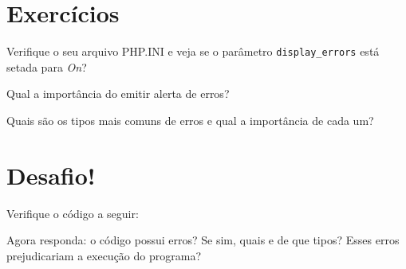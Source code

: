 


\section{Exercícios}
\label{cap11-exercicios}

\begin{description}[labelindent=30pt]
  \item [Q. 01] Verifique o seu arquivo PHP.INI e veja se o parâmetro \texttt{display\_errors} está 
  setada para \textit{On}?  
  \item [Q. 02] Qual a importância do \php emitir alerta de erros? 
  \item [Q. 03] Quais são os tipos mais comuns de erros e qual a importância de cada um?
  
\end{description}

\section{Desafio!}
\label{cap11-desafio}

Verifique o código a seguir:



Agora responda: o código possui erros? Se sim, quais e de que tipos? Esses erros prejudicariam a execução do programa? 